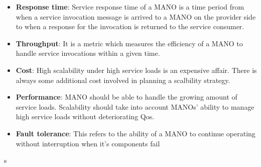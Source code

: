 \begin{itemize}
	\item  \textbf{Response time}: Service response time of a MANO is a time period from when a service invocation message is arrived to a MANO on the provider side to when a response for the invocation is returned to the service consumer.
	\item \textbf {Throughput}: It is a metric which measures the efficiency of a MANO to handle service invocations within a given time.
	\item \textbf{Cost}: High scalability under high service loads is an expensive affair. There is always some additional cost involved in planning a scalbility strategy.
	\item \textbf{Performance}: MANO should be able to handle the growing amount of service loads. Scalability should take into account MANOs' ability to manage high service loads without deteriorating Qos.
	\item \textbf{Fault tolerance}: This refers to the ability of a MANO to continue operating without interruption when it's components fail
\end{itemize}s